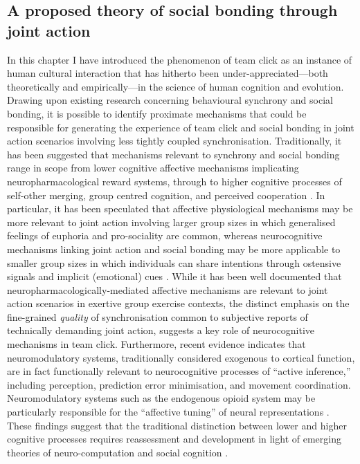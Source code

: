 \begin{CJK}{UTF8}{gbsn}
\clearpage
\section{A proposed theory of social bonding through joint action}
In this chapter I have introduced the phenomenon of team click as an instance of human cultural interaction that has hitherto been under-appreciated---both theoretically and empirically---in the science of human cognition and evolution.  Drawing upon existing research concerning behavioural synchrony and social bonding, it is possible to identify proximate mechanisms that could be responsible for generating the experience of team click and social bonding in joint action scenarios involving less tightly coupled synchronisation.
Traditionally, it has been suggested that mechanisms relevant to synchrony and social bonding range in scope from lower cognitive affective mechanisms implicating neuropharmacological reward systems, through to higher cognitive processes of self-other merging, group centred cognition, and perceived cooperation \citep{Mogan2017}. In particular, it has been speculated that affective physiological mechanisms may be more relevant to joint action involving larger group sizes in which generalised feelings of euphoria and pro-sociality are common, whereas neurocognitive mechanisms linking joint action and social bonding may be more applicable to smaller group sizes in which individuals can share intentions through ostensive signals and implicit (emotional) cues \citep{Semin2008,Frith2010}.
While it has been well documented that neuropharmacologically-mediated affective mechanisms are relevant to joint action scenarios in exertive group exercise contexts\citep{Cohen2009,Sullivan2013,Tarr2015}, the distinct emphasis on the fine-grained \textit{quality} of synchronisation common to subjective reports of technically demanding joint action, suggests a key role of neurocognitive mechanisms in team click.
Furthermore, recent evidence indicates that neuromodulatory systems, traditionally considered exogenous to cortical function, are in fact functionally relevant to neurocognitive processes of ``active inference,'' including perception, prediction error minimisation, and movement coordination\citep{Pessoa2013,Krahe2013,Buchel2014,Miller2017}.  Neuromodulatory systems such as the endogenous opioid system may be particularly responsible for the ``affective tuning'' of neural representations \citep{Panksepp1998,Pessoa2013}. These findings suggest that the traditional distinction between lower and higher cognitive processes requires reassessment and development in light of emerging theories of neuro-computation and social cognition \citep{Pessoa2013,Clark2013}.


\end{CJK}

